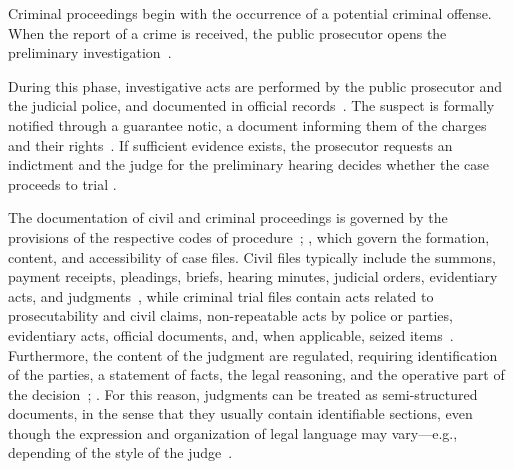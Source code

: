 
Criminal proceedings begin with the occurrence of a potential criminal offense. When the report of a crime is received, the public prosecutor opens the preliminary investigation~\cite[Article 326]{CPP}.

During this phase, investigative acts are performed by the public prosecutor and the judicial police, and documented in official records~\cite[Article 373]{CPP}. The suspect is formally notified through a guarantee notic, a document informing them of the charges and their rights~\cite[Article 369]{CPP}. If sufficient evidence exists, the prosecutor requests an indictment and the judge for the preliminary hearing decides whether the case proceeds to trial \cite[Article 416]{CPP}.


The documentation of civil and criminal proceedings is governed by the provisions of the respective codes of procedure~\cite[Articles 168--169]{CPC}; \cite[Articles 431, 114, 391-octies]{CPP}, which govern the formation, content, and accessibility of case files.
Civil files typically include the summons, payment receipts, pleadings, briefs, hearing minutes, judicial orders, evidentiary acts, and judgments~\cite[Article 168]{CPC}, while criminal trial files contain acts related to prosecutability and civil claims, non-repeatable acts by police or parties, evidentiary acts, official documents, and, when applicable, seized items~\cite[Article 431]{CPP}.
Furthermore, the content of the judgment are regulated, requiring identification of the parties, a statement of facts, the legal reasoning, and the operative part of the decision~\cite[Articles 544--545]{CPP}; \cite[Article 133]{CPC}. For this reason, judgments can be treated as semi-structured documents, in the sense that they usually contain identifiable sections, even though the expression and organization of legal language may vary---e.g., depending of the style of the judge~\cite{juliahb2024,galli2025analisi,pont2023legalsummarisationllmsprodigit}.

